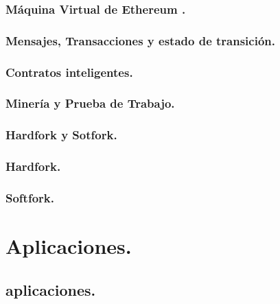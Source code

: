 \documentclass[usenames,dvipsnames]{beamer}
\begin{document}
\subsubsection{ Máquina Virtual de Ethereum . }
\subsubsection{ Mensajes, Transacciones y estado de transición. }
\subsubsection{ Contratos inteligentes. }
\subsubsection{ Minería y Prueba de Trabajo. }
\subsubsection{ Hardfork y Sotfork. }
\subsubsection{ Hardfork. }
\subsubsection{ Softfork. }

\section { Aplicaciones. }
\subsection{aplicaciones. }
\end{document}
